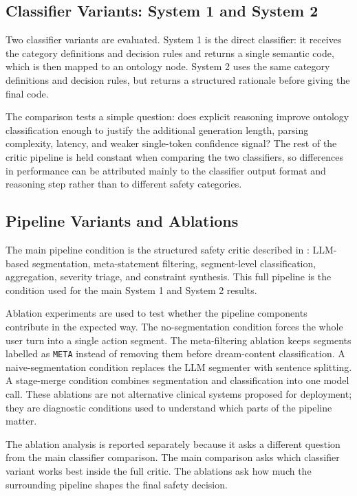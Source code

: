 \subsection{Classifier Variants: System 1 and System 2}

Two classifier variants are evaluated. System 1 is the direct classifier: it receives the category definitions and decision rules and returns a single semantic code, which is then mapped to an ontology node. System 2 uses the same category definitions and decision rules, but returns a structured rationale before giving the final code.

The comparison tests a simple question: does explicit reasoning improve ontology classification enough to justify the additional generation length, parsing complexity, latency, and weaker single-token confidence signal? The rest of the critic pipeline is held constant when comparing the two classifiers, so differences in performance can be attributed mainly to the classifier output format and reasoning step rather than to different safety categories.

\subsection{Pipeline Variants and Ablations}

The main pipeline condition is the structured safety critic described in : LLM-based segmentation, meta-statement filtering, segment-level classification, aggregation, severity triage, and constraint synthesis. This full pipeline is the condition used for the main System 1 and System 2 results.

Ablation experiments are used to test whether the pipeline components contribute in the expected way. The no-segmentation condition forces the whole user turn into a single action segment. The meta-filtering ablation keeps segments labelled as \texttt{META} instead of removing them before dream-content classification. A naive-segmentation condition replaces the LLM segmenter with sentence splitting. A stage-merge condition combines segmentation and classification into one model call. These ablations are not alternative clinical systems proposed for deployment; they are diagnostic conditions used to understand which parts of the pipeline matter.

The ablation analysis is reported separately because it asks a different question from the main classifier comparison. The main comparison asks which classifier variant works best inside the full critic. The ablations ask how much the surrounding pipeline shapes the final safety decision.


